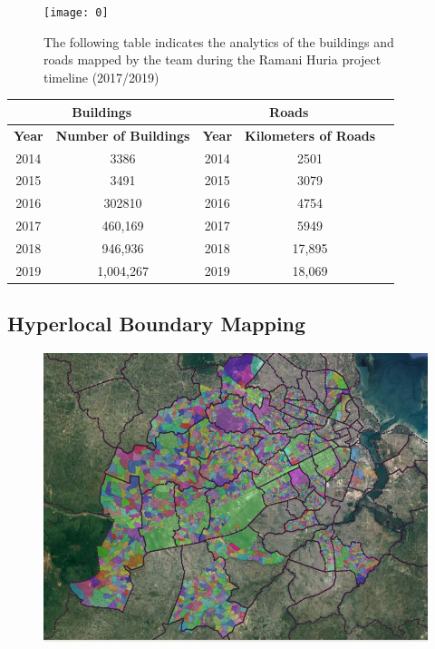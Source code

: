 \documentclass[a4paper,12pt,twoside]{article}
\begin{document}
\begin{figure}[h]
    \centering
    \texttt{[image: 0]}
    \caption{The following table indicates the analytics of the buildings and roads mapped by the team during the Ramani Huria project timeline (2017/2019)}
    \label{fig:my_label}
\end{figure}
\begin{center}
\begin{tabular}{|c|c|c|c|c|}
\hline
\multicolumn{2}{|c|}{\bfseries Buildings} & \multicolumn{2}{|c|}{\bfseries Roads}\\
\hline
\bfseries Year & \bfseries Number of Buildings & \bfseries Year & \bfseries Kilometers of Roads\\
\hline
2014 & 3386 & 2014 & 2501\\
\hline
2015 & 3491 & 2015 & 3079\\
\hline
2016 & 302810 & 2016 & 4754\\
\hline
2017 & 460,169 & 2017 & 5949\\
\hline
2018 & 946,936 & 2018 & 17,895\\
\hline
2019 & 1,004,267 & 2019 & 18,069\\
\hline
\end{tabular}
\end{center}


\newpage
\subsection{Hyperlocal Boundary Mapping}
\begin{figure}[h]
    \centering
    \includegraphics[width=.8\textwidth]{images/shinaexample.jpeg}
    \label{fig:my_label}
\end{figure}
\end{document}
